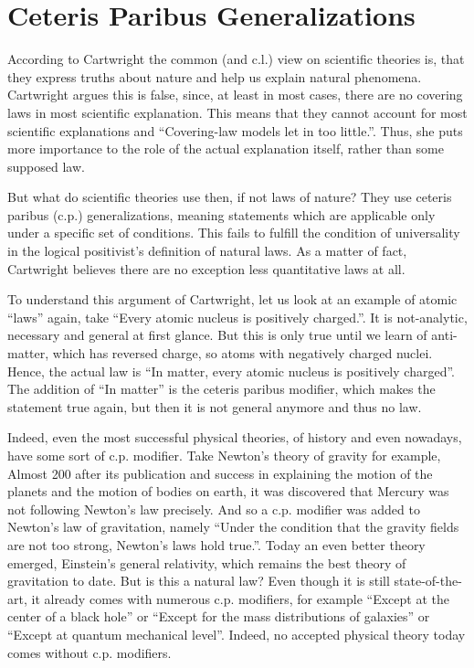 \section*{Ceteris Paribus Generalizations}
According to Cartwright the common (and c.l.) view on scientific theories is, that they
express truths about nature and help us explain natural phenomena.
Cartwright argues this is false, since, at least in most cases, there are no covering laws
in most scientific explanation.
This means that they cannot account for most scientific explanations and
\enquote{Covering-law models let in too little.}\cite[2]{cartwright1980truth}.
Thus, she puts more importance to the role of the actual explanation itself,
rather than some supposed law.

But what do scientific theories use then, if not laws of nature?
They use ceteris paribus (c.p.) generalizations, meaning
statements which are applicable only under a specific set of conditions.
This fails to fulfill the condition of universality in the
logical positivist's
definition of natural laws.
As a matter of fact, Cartwright believes there are no
exception less quantitative laws at all.

To understand this argument of Cartwright, let us look at an example
of atomic \enquote{laws} again, take \enquote{Every atomic nucleus is positively charged.}.
It is not-analytic, necessary and general at first glance. But this is only true until we
learn of anti-matter, which has reversed charge, so atoms with negatively charged nuclei.
Hence, the actual law is \enquote{In matter, every atomic nucleus is positively charged}.
The addition of \enquote{In matter} is the ceteris paribus modifier, which makes the statement
true again, but then it is not general anymore and thus no law.

Indeed, even the most successful physical theories, of history and even nowadays,
have some sort of c.p. modifier.
Take Newton's theory of gravity for example,
Almost 200 after its publication and success in explaining the motion of the planets and
the motion of bodies on earth, it was discovered that Mercury was not following
Newton's law precisely. And so a c.p. modifier was added to
Newton's law of gravitation, namely \enquote{Under the condition that the gravity fields are not too strong,
    Newton's laws hold true.}.
Today an even better theory emerged, Einstein's general relativity, which remains
the best theory of gravitation to date. But is this a natural law?
Even though it is still state-of-the-art, it already comes with numerous c.p.
modifiers, for example \enquote{Except at the center of a black hole} or
\enquote{Except for the mass distributions of galaxies} or \enquote{Except at quantum mechanical level}.
Indeed, no accepted physical theory today comes without c.p. modifiers.

